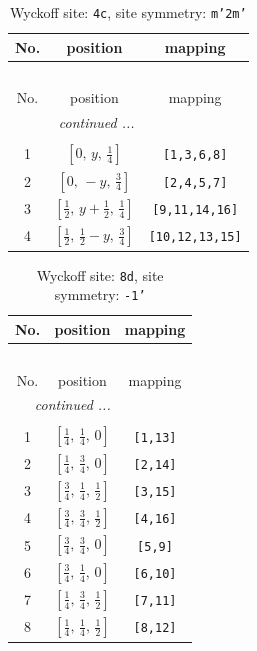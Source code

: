 \documentclass[fleqn,8pt]{jsarticle}
\begin{document}
\renewcommand{\arraystretch}{1.2}
\begin{longtable}{ccc}
\caption{Wyckoff site: {\tt 4c}, site symmetry: {\tt m'2m'}}
 \\
 \hline \hline
No. & position & mapping \\ \hline \endfirsthead

\multicolumn{2}{l}{\tablename\ \thetable{}} \\
 \hline \hline
No. & position & mapping \\ \hline \endhead

 \hline \hline
\multicolumn{2}{r}{\footnotesize\it continued ...} \\ \endfoot

 \hline \hline
\multicolumn{2}{r}{} \\ \endlastfoot

1 & $\left[ 0,\, y,\, \frac{1}{4} \right]$ & {\tt [1,3,6,8]} \\ \hline
2 & $\left[ 0,\, - y,\, \frac{3}{4} \right]$ & {\tt [2,4,5,7]} \\ \hline
3 & $\left[ \frac{1}{2},\, y + \frac{1}{2},\, \frac{1}{4} \right]$ & {\tt [9,11,14,16]} \\ \hline
4 & $\left[ \frac{1}{2},\, \frac{1}{2} - y,\, \frac{3}{4} \right]$ & {\tt [10,12,13,15]} \\
\end{longtable}
\renewcommand{\arraystretch}{1.2}
\begin{longtable}{ccc}
\caption{Wyckoff site: {\tt 8d}, site symmetry: {\tt -1'}}
 \\
 \hline \hline
No. & position & mapping \\ \hline \endfirsthead

\multicolumn{2}{l}{\tablename\ \thetable{}} \\
 \hline \hline
No. & position & mapping \\ \hline \endhead

 \hline \hline
\multicolumn{2}{r}{\footnotesize\it continued ...} \\ \endfoot

 \hline \hline
\multicolumn{2}{r}{} \\ \endlastfoot

1 & $\left[ \frac{1}{4},\, \frac{1}{4},\, 0 \right]$ & {\tt [1,13]} \\ \hline
2 & $\left[ \frac{1}{4},\, \frac{3}{4},\, 0 \right]$ & {\tt [2,14]} \\ \hline
3 & $\left[ \frac{3}{4},\, \frac{1}{4},\, \frac{1}{2} \right]$ & {\tt [3,15]} \\ \hline
4 & $\left[ \frac{3}{4},\, \frac{3}{4},\, \frac{1}{2} \right]$ & {\tt [4,16]} \\ \hline
5 & $\left[ \frac{3}{4},\, \frac{3}{4},\, 0 \right]$ & {\tt [5,9]} \\ \hline
6 & $\left[ \frac{3}{4},\, \frac{1}{4},\, 0 \right]$ & {\tt [6,10]} \\ \hline
7 & $\left[ \frac{1}{4},\, \frac{3}{4},\, \frac{1}{2} \right]$ & {\tt [7,11]} \\ \hline
8 & $\left[ \frac{1}{4},\, \frac{1}{4},\, \frac{1}{2} \right]$ & {\tt [8,12]} \\
\end{longtable}
\end{document}

